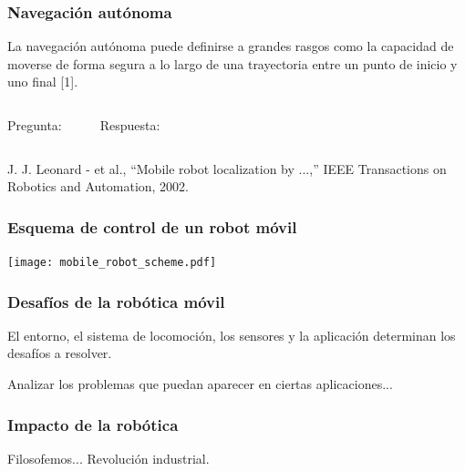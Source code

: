 \begin{frame}
    \frametitle{Navegación autónoma}
    \begin{block}{}
        La navegación autónoma puede definirse a grandes rasgos como la capacidad de moverse de forma segura a lo largo de una trayectoria entre un punto de inicio y uno final [1].
    \end{block}
    \vspace{5mm}
    \footnotesize
    \begin{columns}[t]
        \hspace{13pt}Pregunta:
        \begin{enumerate}
        \end{enumerate}
        Respuesta:
        \begin{enumerate}[$\rightarrow$]
        \end{enumerate}
    \end{columns}
    \vfill
    \begin{tiny}
        [1] J. J. Leonard - et al., ``Mobile robot localization by ...,'' IEEE Transactions on Robotics and Automation, 2002.
    \end{tiny}
\end{frame}

\begin{frame}
    \frametitle{Esquema de control de un robot móvil}
    \centering
    \texttt{[image: mobile\_robot\_scheme.pdf]}
\end{frame}

\begin{frame}
    \frametitle{Desafíos de la robótica móvil}

    El entorno, el sistema de locomoción, los sensores y la aplicación determinan los desafíos a resolver.

    \vspace{1em}

    Analizar los problemas que puedan aparecer en ciertas aplicaciones...

\end{frame}

\begin{frame}
    \frametitle{Impacto de la robótica}

    Filosofemos...
    Revolución industrial.

\end{frame}
